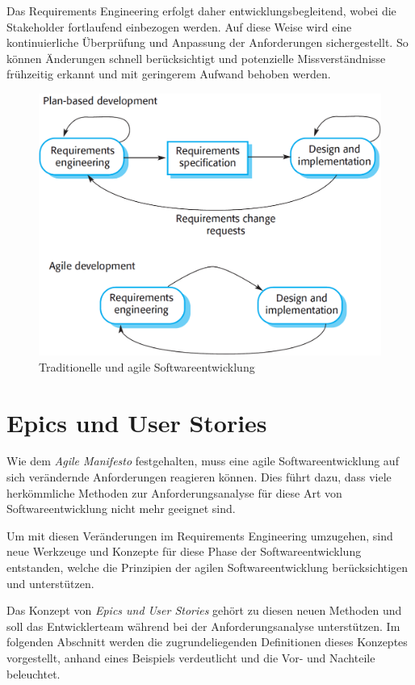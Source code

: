 \documentclass[acmtog]{acmart}
\begin{document}
Das Requirements Engineering erfolgt daher entwicklungsbegleitend, wobei die Stakeholder fortlaufend einbezogen werden. Auf diese Weise wird eine kontinuierliche Überprüfung und Anpassung der Anforderungen sichergestellt.
So können Änderungen schnell berücksichtigt und potenzielle Missverständnisse frühzeitig erkannt und mit geringerem Aufwand behoben werden.

\begin{figure}[t]
  \centering
  \includegraphics[width=\linewidth]{images/plandriven-and-agil-development.png}
  \caption{Traditionelle und agile Softwareentwicklung \cite{sommerville16}}
    \label{fig:development}
  \Description{}
\end{figure}

\section{Epics und User Stories}
Wie dem \emph{Agile Manifesto} \cite{beedle_principles_2001} festgehalten, muss eine agile Softwareentwicklung
auf sich verändernde Anforderungen reagieren können.
Dies führt dazu, dass viele herkömmliche Methoden zur Anforderungsanalyse für diese Art von Softwareentwicklung
nicht mehr geeignet sind.

Um mit diesen Veränderungen im Requirements Engineering umzugehen, sind neue Werkzeuge und Konzepte
für diese Phase der Softwareentwicklung entstanden, welche die Prinzipien der agilen Softwareentwicklung
berücksichtigen und unterstützen.

Das Konzept von \emph{Epics und User Stories} gehört zu diesen neuen Methoden und soll das Entwicklerteam
während bei der Anforderungsanalyse unterstützen. Im folgenden Abschnitt werden die zugrundeliegenden Definitionen
dieses Konzeptes vorgestellt, anhand eines Beispiels verdeutlicht und die Vor- und Nachteile beleuchtet.
\end{document}
